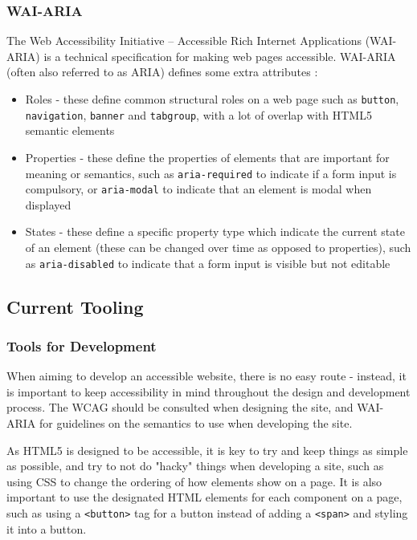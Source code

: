 \documentclass[ %
                    author={Aleena Baig},
                supervisor={Dr Simon Lock},
                    degree={BSc},
                     title={On Making Web Accessible Graphs},
                  subtitle={},
                      year={2019} ]{dissertation}
\begin{document}
\subsubsection{WAI-ARIA}

The Web Accessibility Initiative – Accessible Rich Internet Applications (WAI-ARIA) is a technical specification for making web pages accessible. WAI-ARIA (often also referred to as ARIA) defines some extra attributes :

\begin{itemize}
    \item Roles - these define common structural roles on a web page such as \texttt{button}, \texttt{navigation}, \texttt{banner} and \texttt{tabgroup}, with a lot of overlap with HTML5 semantic elements
    \item Properties - these define the properties of elements that are important for meaning or semantics, such as \texttt{aria-required} to indicate if a form input is compulsory, or \texttt{aria-modal} to indicate that an element is modal when displayed
    \item States - these define a specific property type which indicate the current state of an element (these can be changed over time as opposed to properties), such as \texttt{aria-disabled} to indicate that a form input is visible but not editable
\end{itemize}

\subsection{Current Tooling}

\subsubsection{Tools for Development}

When aiming to develop an accessible website, there is no easy route - instead, it is important to keep accessibility in mind throughout the design and development process. The WCAG should be consulted when designing the site, and WAI-ARIA for guidelines on the semantics to use when developing the site.

As HTML5 is designed to be accessible, it is key to try and keep things as simple as possible, and try to not do "hacky" things when developing a site, such as using CSS to change the ordering of how elements show on a page. It is also important to use the designated HTML elements for each component on a page, such as using a \texttt{<button>} tag for a button instead of adding a \texttt{<span>} and styling it into a button.
\end{document}
